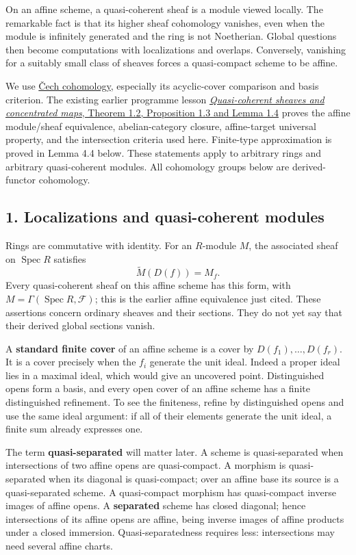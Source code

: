 \documentclass[11pt]{article}
\begin{document}
On an affine scheme, a quasi-coherent sheaf is a module viewed locally.
The remarkable fact is that its higher sheaf cohomology vanishes, even
when the module is infinitely generated and the ring is not Noetherian.
Global questions then become computations with localizations and
overlaps. Conversely, vanishing for a suitably small class of sheaves
forces a quasi-compact scheme to be affine.

We use \href{cech-cohomology.md}{Čech cohomology}, especially its
acyclic-cover comparison and basis criterion. The existing earlier
programme lesson
\href{../derived-categories-and-sheaf-operations/quasi-coherent-sheaves-and-concentrated-maps.html\#1-affine-sheaves-and-localization}{\emph{Quasi-coherent
sheaves and concentrated maps}, Theorem 1.2, Proposition 1.3 and Lemma
1.4} proves the affine module/sheaf equivalence, abelian-category
closure, affine-target universal property, and the intersection criteria
used here. Finite-type approximation is proved in Lemma 4.4 below. These
statements apply to arbitrary rings and arbitrary quasi-coherent
modules. All cohomology groups below are derived-functor cohomology.

\subsection{1. Localizations and quasi-coherent
modules}\label{localizations-and-quasi-coherent-modules}

Rings are commutative with identity. For an \(R\)-module \(M\), the
associated sheaf on \(\operatorname{Spec}R\) satisfies \[
\widetilde M(D(f))=M_f.
\] Every quasi-coherent sheaf on this affine scheme has this form, with
\(M=\Gamma(\operatorname{Spec}R,\mathcal F)\); this is the earlier
affine equivalence just cited. These assertions concern ordinary sheaves
and their sections. They do not yet say that their derived global
sections vanish.

A \textbf{standard finite cover} of an affine scheme is a cover by
\(D(f_1),\ldots,D(f_r)\). It is a cover precisely when the \(f_i\)
generate the unit ideal. Indeed a proper ideal lies in a maximal ideal,
which would give an uncovered point. Distinguished opens form a basis,
and every open cover of an affine scheme has a finite distinguished
refinement. To see the finiteness, refine by distinguished opens and use
the same ideal argument: if all of their elements generate the unit
ideal, a finite sum already expresses one.

The term \textbf{quasi-separated} will matter later. A scheme is
quasi-separated when intersections of two affine opens are
quasi-compact. A morphism is quasi-separated when its diagonal is
quasi-compact; over an affine base its source is a quasi-separated
scheme. A quasi-compact morphism has quasi-compact inverse images of
affine opens. A \textbf{separated} scheme has closed diagonal; hence
intersections of its affine opens are affine, being inverse images of
affine products under a closed immersion. Quasi-separatedness requires
less: intersections may need several affine charts.
\end{document}
